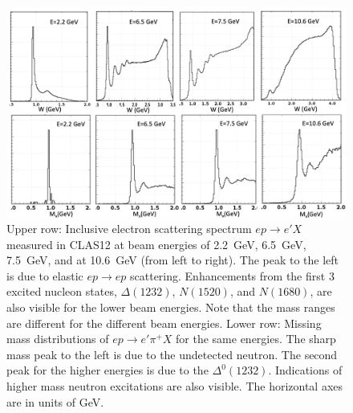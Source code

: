 \documentclass[final,3p,twocolumn]{elsarticle}
\begin{document}
\begin{figure}[ht]
\centerline{\includegraphics[width=1.8\columnwidth]{W-spectrum.png}}
\caption{Upper row: Inclusive electron scattering spectrum $ep \to e' X$ measured in CLAS12 at beam energies 
of 2.2~GeV, 6.5~GeV, 7.5~GeV, and at 10.6~GeV (from left to right). The peak to the left is due to elastic $ep \to ep$
scattering. Enhancements from the first 3 excited nucleon states, $\Delta(1232)$, $N(1520)$, and $N(1680)$, are also
visible for the lower beam energies. Note that the mass ranges  are different for the different beam energies. Lower
row:  Missing mass distributions of $ep\to e' \pi^+X$ for the same energies. The sharp mass peak to the left is due
to the undetected neutron. The second peak for the higher energies is due to the $\Delta^0(1232)$. Indications of higher
mass neutron excitations are also visible. The horizontal axes are in units of GeV. } 
\label{spectrum}
\end{figure} 
\end{document}
